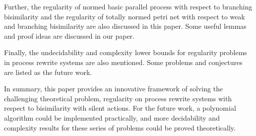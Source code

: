 \begin{englishabstract}
Further, the regularity of normed basic parallel process with respect to branching bisimilarity and the regularity of totally normed petri net with respect to weak and branching bisimilarity are also discussed in this paper. Some useful lemmas and proof ideas are discussed in our paper.

Finally, the undecidability and complexity lower bounds for regularity problems in process rewrite systems are also mentioned. Some problems and conjectures are listed as the future work.

In summary, this paper provides an innovative framework of solving the challenging theoretical problem, regularity on process rewrite systems with respect to bisimilarity with silent actions. For the future work, a polynomial algorithm could be implemented practically, and more decidability and complexity results for these series of problems could be proved theoretically.

\end{englishabstract}
